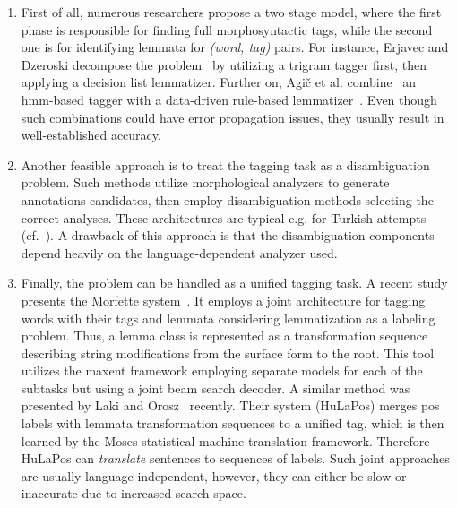 \begin{enumerate}
  \item First of all, numerous researchers propose a two stage model, where the first phase is responsible for finding full morphosyntactic tags, while the second one is for identifying lemmata for \emph{(word, tag)} pairs. 
  For instance, Erjavec and Dzeroski decompose the problem~\cite{Erjavec2004} by utilizing a trigram  tagger first, then applying a decision list lemmatizer. \label{part:general-lemmatization}
  Further on, Agič et al. combine~\cite{Agic2013} an \acrshort{hmm}-based tagger with a data-driven rule-based lemmatizer~\cite{Jongejan}. 
  Even though such combinations could have error propagation issues, they usually result in well-established accuracy.
  \item Another feasible approach is to treat the tagging task as a disambiguation problem. 
  Such methods utilize morphological analyzers to generate annotations candidates, then employ disambiguation methods selecting the correct analyses.
  These architectures are typical e.g. for Turkish attempts (cf.~\cite{Sak2007,Hakkani-Tur2002}).
  A drawback of this approach is that the disambiguation components depend heavily on the language-dependent analyzer used.
  \item Finally, the problem can be handled as a unified tagging task.
  A recent study presents the Morfette system~\cite{Chrupaa2008}.
  It employs a joint architecture for tagging words with their tags and lemmata considering lemmatization as a labeling problem.
  Thus, a lemma class is represented as a transformation sequence describing string modifications from the surface form to the root.
  This tool utilizes the \acrshort{maxent} framework employing separate models for each of the subtasks but using a joint beam search decoder.
  A similar method was presented by Laki and Orosz~\cite{Laki2013} recently.
  Their system (HuLaPos) merges \gls{pos} labels with lemmata transformation sequences to a unified tag, which is then learned by the Moses statistical machine translation framework.
  Therefore HuLaPos can \emph{translate} sentences to sequences of labels.
  Such joint approaches are usually language independent, however, they can either be slow or inaccurate due to increased search space.
\end{enumerate}


